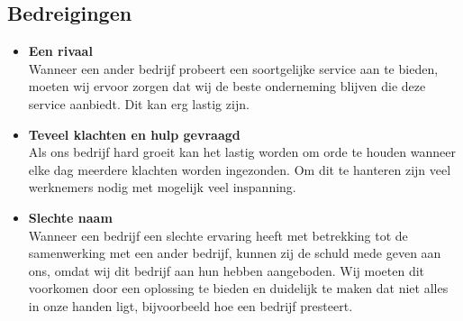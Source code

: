 \subsection{Bedreigingen}
\begin{itemize}
\item {\bf Een rivaal} \\
  Wanneer een ander bedrijf probeert een soortgelijke service aan te bieden, moeten wij ervoor zorgen dat wij de beste onderneming blijven die deze service aanbiedt. Dit kan erg lastig zijn.
\item {\bf Teveel klachten en hulp gevraagd} \\
  Als ons bedrijf hard groeit kan het lastig worden om orde te houden wanneer elke dag meerdere klachten worden ingezonden. Om dit te hanteren zijn veel werknemers nodig met mogelijk veel inspanning. 
\item {\bf Slechte naam} \\
  Wanneer een bedrijf een slechte ervaring heeft met betrekking tot de samenwerking met een ander bedrijf, kunnen zij de schuld mede geven aan ons, omdat wij dit bedrijf aan hun hebben aangeboden. Wij moeten dit voorkomen door een oplossing te bieden en duidelijk te maken dat niet alles in onze handen ligt, bijvoorbeeld hoe een bedrijf presteert.
\end{itemize}